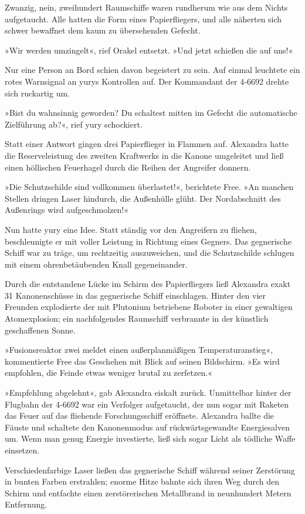 Zwanzig, nein, zweihundert Raumschiffe waren rundherum wie aus dem Nichts aufgetaucht. Alle hatten die Form eines Papierfliegers, und alle näherten sich schwer bewaffnet dem kaum zu übersehenden Gefecht.

»Wir werden umzingelt«, rief Orakel entsetzt. »Und jetzt schießen die auf uns!«

Nur eine Person an Bord schien davon begeistert zu sein. Auf einmal leuchtete ein rotes Warnsignal an yurys Kontrollen auf. Der Kommandant der 4-6692 drehte sich ruckartig um.

»Bist du wahnsinnig geworden? Du schaltest mitten im Gefecht die automatische Zielführung ab?«, rief yury schockiert.

Statt einer Antwort gingen drei Papierflieger in Flammen auf. Alexandra hatte die Reserveleistung des zweiten Kraftwerks in die Kanone umgeleitet und ließ einen höllischen Feuerhagel durch die Reihen der Angreifer donnern.

»Die Schutzschilde sind vollkommen überlastet!«, berichtete Free. »An manchen Stellen dringen Laser hindurch, die Außenhülle glüht. Der Nordabschnitt des Außenrings wird aufgeschmolzen!«

Nun hatte yury eine Idee. Statt ständig vor den Angreifern zu fliehen, beschleunigte er mit voller Leistung in Richtung eines Gegners. Das gegnerische Schiff war zu träge, um rechtzeitig auszuweichen, und die Schutzschilde schlugen mit einem ohrenbetäubenden Knall gegeneinander.

Durch die entstandene Lücke im Schirm des Papierfliegers ließ Alexandra exakt 31 Kanonenschüsse in das gegnerische Schiff einschlagen. Hinter den vier Freunden explodierte der mit Plutonium betriebene Roboter in einer gewaltigen Atomexplosion; ein nachfolgendes Raumschiff verbrannte in der künstlich geschaffenen Sonne.

»Fusionsreaktor zwei meldet einen außerplanmäßigen Temperaturanstieg«, kommentierte Free das Geschehen mit Blick auf seinen Bildschirm. »Es wird empfohlen, die Feinde etwas weniger brutal zu zerfetzen.«

»Empfehlung abgelehnt«, gab Alexandra eiskalt zurück. Unmittelbar hinter der Flugbahn der 4-6692 war ein Verfolger aufgetaucht, der nun sogar mit Raketen das Feuer auf das fliehende Forschungsschiff eröffnete. Alexandra ballte die Fäuste und schaltete den Kanonenmodus auf rückwärtsgewandte Energiesalven um. Wenn man genug Energie investierte, ließ sich sogar Licht als tödliche Waffe einsetzen.

Verschiedenfarbige Laser ließen das gegnerische Schiff während seiner Zerstörung in bunten Farben erstrahlen; enorme Hitze bahnte sich ihren Weg durch den Schirm und entfachte einen zerstörerischen Metallbrand in neunhundert Metern Entfernung.

